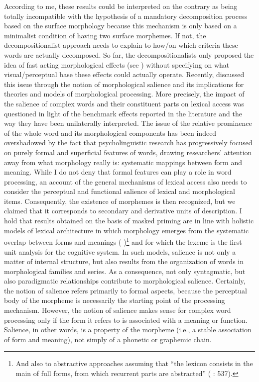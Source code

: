 \documentclass[output=paper]{langsci/langscibook}
\begin{document}
According to me, these results could be interpreted on the contrary as
being totally incompatible with the hypothesis of a mandatory
decomposition process based on the surface morphology because this
mechanism is only based on a minimalist condition of having two surface
morphemes. If not, the decompositionalist approach needs to explain to
how/on which criteria these words are actually decomposed. So far, the
decompositionalists only proposed the idea of fast acting morphological
effects (see %
\citealt{DiependaeleMorrisEtAl2013}%
%
%
) without specifying on what
visual/perceptual base these effects could actually operate. Recently,
%
\citet{GiraudoDalMaso2016} %
%
discussed this issue through the notion of
morphological salience and its implications for theories and models of
morphological processing. More precisely, the impact of the salience of
complex words and their constituent parts on lexical access was
questioned in light of the benchmark effects reported in the literature
and the way they have been unilaterally interpreted. The issue of the
relative prominence of the whole word and its morphological components
has been indeed overshadowed by the fact that psycholinguistic research
has progressively focused on purely formal and superficial features of
words, drawing researchers' attention away from what morphology really
is: systematic mappings between form and meaning. While I do not deny
that formal features can play a role in word processing, an account of
the general mechanisms of lexical access also needs to consider the
perceptual and functional salience of lexical and morphological items.
Consequently, the existence of morphemes is then recognized, but we
claimed that it corresponds to secondary and derivative units of
description. I hold that results obtained on the basis of masked
priming are in line with holistic models of lexical architecture in
which morphology emerges from the systematic overlap between forms and
meanings (%
\citealt{Baayen11}
)\footnote{And also to abstractive
  approaches assuming that ``the lexicon consists in the main of full
  forms, from which recurrent parts are abstracted'' (%
\citealt{Blevins06}%
%
%
: 537).} and for which the lexeme is the first unit analysis for the
cognitive system. In such models, salience is not only a matter of
internal structure, but also results from the organization of words in
morphological families and series. As a consequence, not only
syntagmatic, but also paradigmatic relationships contribute to
morphological salience. Certainly, the notion of salience refers
primarily to formal aspects, because the perceptual body of the morpheme
is necessarily the starting point of the processing mechanism. However,
the notion of salience makes sense for complex word processing only if
the form it refers to is associated with a meaning or function.
Salience, in other words, is a property of the morpheme (i.e., a stable
association of form and meaning), not simply of a phonetic or graphemic
chain.
\end{document}
